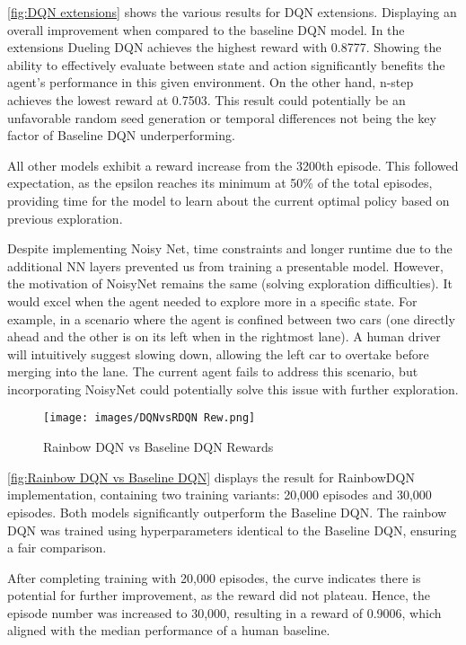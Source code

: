 \documentclass{article}
\begin{document}
\autoref{fig:DQN extensions} shows the various results for DQN extensions. Displaying an overall improvement when compared to the baseline DQN model. In the extensions Dueling DQN achieves the highest reward with 0.8777. Showing the ability to effectively evaluate between state and action significantly benefits the agent’s performance in this given environment. On the other hand, n-step achieves the lowest reward at 0.7503. This result could potentially be an unfavorable random seed generation or temporal differences not being the key factor of Baseline DQN underperforming.

All other models exhibit a reward increase from the 3200th episode. This followed expectation, as the epsilon reaches its minimum at 50\% of the total episodes, providing time for the model to learn about the current optimal policy based on previous exploration.

Despite implementing Noisy Net, time constraints and longer runtime due to the additional NN layers prevented us from training a presentable model. However, the motivation of NoisyNet remains the same (solving exploration difficulties). It would excel when the agent needed to explore more in a specific state. For example, in a scenario where the agent is confined between two cars (one directly ahead and the other is on its left when in the rightmost lane). A human driver will intuitively suggest slowing down, allowing the left car to overtake before merging into the lane. The current agent fails to address this scenario, but incorporating NoisyNet could potentially solve this issue with further exploration.

\begin{figure}[h]
    \centering
    \texttt{[image: images/DQNvsRDQN Rew.png]}
    \caption{Rainbow DQN vs Baseline DQN Rewards}
    \label{fig:Rainbow DQN vs Baseline DQN}
\end{figure}

\autoref{fig:Rainbow DQN vs Baseline DQN} displays the result for RainbowDQN implementation, containing two training variants: 20,000 episodes and 30,000 episodes. Both models significantly outperform the Baseline DQN. The rainbow DQN was trained using hyperparameters identical to the Baseline DQN, ensuring a fair comparison.

After completing training with 20,000 episodes, the curve indicates there is potential for further improvement, as the reward did not plateau. Hence, the episode number was increased to 30,000, resulting in a reward of 0.9006, which aligned with the median performance of a human baseline.
\end{document}
